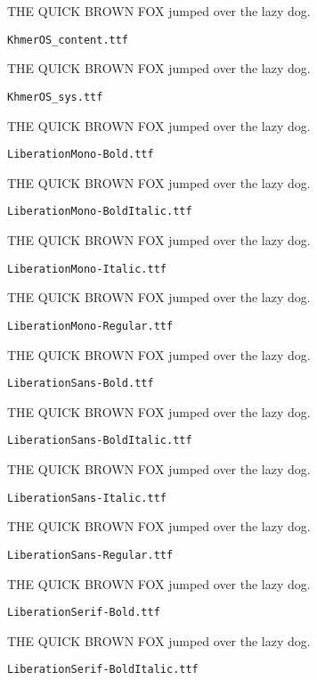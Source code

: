 \documentclass{article}
\begin{document}
THE QUICK BROWN FOX jumped over the lazy dog.

\setmainfont[Extension=.ttf]{KhmerOS_content}
\noindent \verb!KhmerOS_content.ttf!

THE QUICK BROWN FOX jumped over the lazy dog.

\setmainfont[Extension=.ttf]{KhmerOS_sys}
\noindent \verb!KhmerOS_sys.ttf!

THE QUICK BROWN FOX jumped over the lazy dog.

\setmainfont[Extension=.ttf]{LiberationMono-Bold}
\noindent \verb!LiberationMono-Bold.ttf!

THE QUICK BROWN FOX jumped over the lazy dog.

\setmainfont[Extension=.ttf]{LiberationMono-BoldItalic}
\noindent \verb!LiberationMono-BoldItalic.ttf!

THE QUICK BROWN FOX jumped over the lazy dog.

\setmainfont[Extension=.ttf]{LiberationMono-Italic}
\noindent \verb!LiberationMono-Italic.ttf!

THE QUICK BROWN FOX jumped over the lazy dog.

\setmainfont[Extension=.ttf]{LiberationMono-Regular}
\noindent \verb!LiberationMono-Regular.ttf!

THE QUICK BROWN FOX jumped over the lazy dog.

\setmainfont[Extension=.ttf]{LiberationSans-Bold}
\noindent \verb!LiberationSans-Bold.ttf!

THE QUICK BROWN FOX jumped over the lazy dog.

\setmainfont[Extension=.ttf]{LiberationSans-BoldItalic}
\noindent \verb!LiberationSans-BoldItalic.ttf!

THE QUICK BROWN FOX jumped over the lazy dog.

\setmainfont[Extension=.ttf]{LiberationSans-Italic}
\noindent \verb!LiberationSans-Italic.ttf!

THE QUICK BROWN FOX jumped over the lazy dog.

\setmainfont[Extension=.ttf]{LiberationSans-Regular}
\noindent \verb!LiberationSans-Regular.ttf!

THE QUICK BROWN FOX jumped over the lazy dog.

\setmainfont[Extension=.ttf]{LiberationSerif-Bold}
\noindent \verb!LiberationSerif-Bold.ttf!

THE QUICK BROWN FOX jumped over the lazy dog.

\setmainfont[Extension=.ttf]{LiberationSerif-BoldItalic}
\noindent \verb!LiberationSerif-BoldItalic.ttf!
\end{document}
